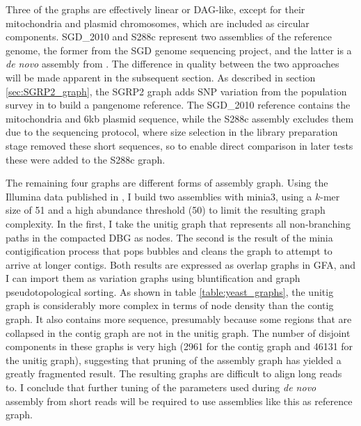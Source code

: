 Three of the graphs are effectively linear or DAG-like, except for their mitochondria and plasmid chromosomes, which are included as circular components.
SGD\_2010 and S288c represent two assemblies of the reference genome, the former from the SGD genome sequencing project, and the latter is a \emph{de novo} assembly from \cite{yue2017contrasting}.
The difference in quality between the two approaches will be made apparent in the subsequent section.
As described in section \ref{sec:SGRP2_graph}, the SGRP2 graph adds SNP variation from the population survey in \cite{bergstrom2014high} to build a pangenome reference.
The SGD\_2010 reference contains the mitochondria and 6kb plasmid sequence, while the S288c assembly excludes them due to the sequencing protocol, where size selection in the library preparation stage removed these short sequences, so to enable direct comparison in later tests these were added to the S288c graph.

The remaining four graphs are different forms of assembly graph.
Using the Illumina data published in \cite{yue2017contrasting}, I build two assemblies with minia3, using a $k$-mer size of 51 and a high abundance threshold (50) to limit the resulting graph complexity.
In the first, I take the unitig graph that represents all non-branching paths in the compacted DBG as nodes.
The second is the result of the minia contigification process that pops bubbles and cleans the graph to attempt to arrive at longer contigs.
Both results are expressed as overlap graphs in GFA, and I can import them as variation graphs using bluntification and graph pseudotopological sorting.
As shown in table \ref{table:yeast_graphs}, the unitig graph is considerably more complex in terms of node density than the contig graph.
It also contains more sequence, presumably because some regions that are collapsed in the contig graph are not in the unitig graph.
The number of disjoint components in these graphs is very high (2961 for the contig graph and 46131 for the unitig graph), suggesting that pruning of the assembly graph has yielded a greatly fragmented result.
The resulting graphs are difficult to align long reads to.
I conclude that further tuning of the parameters used during \emph{de novo} assembly from short reads will be required to use assemblies like this as reference graph.

